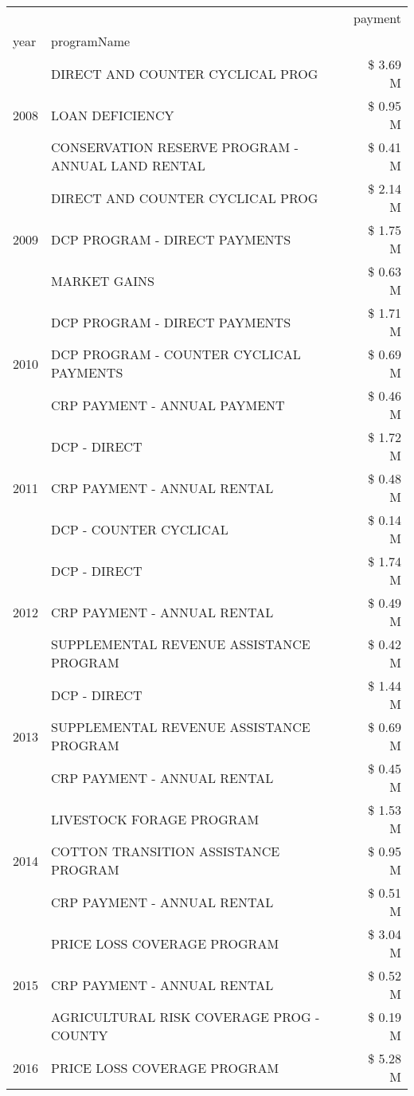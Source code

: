 \begin{tabular}{llr}
\toprule
 &  & payment \\
year & programName &  \\
\midrule
\multirow[t]{3}{*}{2008} & DIRECT AND COUNTER CYCLICAL PROG & \$ 3.69 M \\
 & LOAN DEFICIENCY & \$ 0.95 M \\
 & CONSERVATION RESERVE PROGRAM - ANNUAL LAND RENTAL & \$ 0.41 M \\
\cline{1-3}
\multirow[t]{3}{*}{2009} & DIRECT AND COUNTER CYCLICAL PROG & \$ 2.14 M \\
 & DCP PROGRAM - DIRECT PAYMENTS & \$ 1.75 M \\
 & MARKET GAINS & \$ 0.63 M \\
\cline{1-3}
\multirow[t]{3}{*}{2010} & DCP PROGRAM - DIRECT PAYMENTS & \$ 1.71 M \\
 & DCP PROGRAM - COUNTER CYCLICAL PAYMENTS & \$ 0.69 M \\
 & CRP PAYMENT - ANNUAL PAYMENT & \$ 0.46 M \\
\cline{1-3}
\multirow[t]{3}{*}{2011} & DCP - DIRECT & \$ 1.72 M \\
 & CRP PAYMENT - ANNUAL RENTAL & \$ 0.48 M \\
 & DCP - COUNTER CYCLICAL & \$ 0.14 M \\
\cline{1-3}
\multirow[t]{3}{*}{2012} & DCP - DIRECT & \$ 1.74 M \\
 & CRP PAYMENT - ANNUAL RENTAL & \$ 0.49 M \\
 & SUPPLEMENTAL REVENUE ASSISTANCE PROGRAM & \$ 0.42 M \\
\cline{1-3}
\multirow[t]{3}{*}{2013} & DCP - DIRECT & \$ 1.44 M \\
 & SUPPLEMENTAL REVENUE ASSISTANCE PROGRAM & \$ 0.69 M \\
 & CRP PAYMENT - ANNUAL RENTAL & \$ 0.45 M \\
\cline{1-3}
\multirow[t]{3}{*}{2014} & LIVESTOCK FORAGE PROGRAM & \$ 1.53 M \\
 & COTTON TRANSITION ASSISTANCE PROGRAM & \$ 0.95 M \\
 & CRP PAYMENT - ANNUAL RENTAL & \$ 0.51 M \\
\cline{1-3}
\multirow[t]{3}{*}{2015} & PRICE LOSS COVERAGE PROGRAM & \$ 3.04 M \\
 & CRP PAYMENT - ANNUAL RENTAL & \$ 0.52 M \\
 & AGRICULTURAL RISK COVERAGE PROG - COUNTY & \$ 0.19 M \\
\cline{1-3}
\multirow[t]{3}{*}{2016} & PRICE LOSS COVERAGE PROGRAM                   & \$ 5.28 M \\

\end{tabular}
